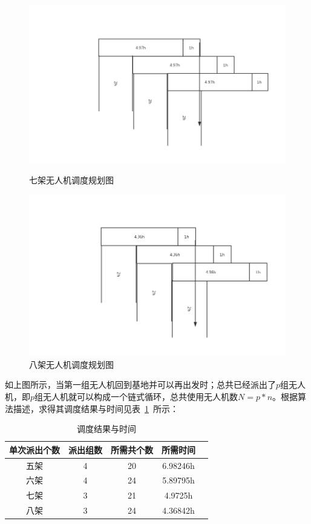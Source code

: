 \documentclass{whutmod}
\begin{document}
	\begin{figure}[H]
	\begin{minipage}[t]{0.5\linewidth}
		\centering
		\includegraphics[width=\textwidth]{figures/7j.png}
		\caption{七架无人机调度规划图}\label{7j}
	\end{minipage}
	\hfill%
	\begin{minipage}[t]{0.5\linewidth}
		\centering
		\includegraphics[width=\textwidth]{figures/8j.png}
		\caption{八架无人机调度规划图}\label{8j}
	\end{minipage}
\end{figure}
	如上图所示，当第一组无人机回到基地并可以再出发时；总共已经派出了$p$组无人机，即$p$组无人机就可以构成一个链式循环，总共使用无人机数$N=p*n$。根据算法描述，求得其调度结果与时间见表~\ref{labelll}~所示：
	\begin{table}[H]
	\caption{调度结果与时间}\label{labelll} \centering
	\begin{tabular}{ccccc}
		\toprule[1.5pt]
		单次派出个数 &派出组数&  所需共个数 & 所需时间 \\
		\midrule[1pt]
		五架	& 4 &20 &6.98246h\\
		六架	& 4 & 24 &5.89795h\\
		七架	& 3 &21 &4.9725h\\
		八架	& 3 &24 &4.36842h\\
		\bottomrule[1.5pt]
	\end{tabular}
\end{table}
\end{document}
